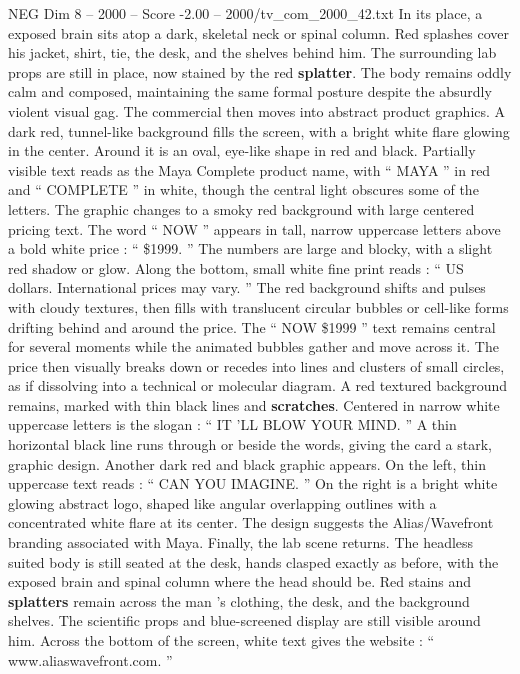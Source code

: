 \begin{textsample}{NEG Dim 8 – 2000 – Score -2.00 – 2000/tv\_com\_2000\_42.txt}
In its place, a exposed brain sits atop a dark, skeletal neck or spinal column.
Red splashes cover his jacket, shirt, tie, the desk, and the shelves behind him.
The surrounding lab props are still in place, now stained by the red \textbf{splatter}.
The body remains oddly calm and composed, maintaining the same formal posture despite the absurdly violent visual gag.
The commercial then moves into abstract product graphics.
A dark red, tunnel-like background fills the screen, with a bright white flare glowing in the center.
Around it is an oval, eye-like shape in red and black.
Partially visible text reads as the Maya Complete product name, with “ MAYA ” in red and “ COMPLETE ” in white, though the central light obscures some of the letters.
The graphic changes to a smoky red background with large centered pricing text.
The word “ NOW ” appears in tall, narrow uppercase letters above a bold white price : “ \$1999. ” The numbers are large and blocky, with a slight red shadow or glow.
Along the bottom, small white fine print reads : “ US dollars.
International prices may vary. ” The red background shifts and pulses with cloudy textures, then fills with translucent circular bubbles or cell-like forms drifting behind and around the price.
The “ NOW \$1999 ” text remains central for several moments while the animated bubbles gather and move across it.
The price then visually breaks down or recedes into lines and clusters of small circles, as if dissolving into a technical or molecular diagram.
A red textured background remains, marked with thin black lines and \textbf{scratches}.
Centered in narrow white uppercase letters is the slogan : “ IT ’LL BLOW YOUR MIND. ” A thin horizontal black line runs through or beside the words, giving the card a stark, graphic design.
Another dark red and black graphic appears.
On the left, thin uppercase text reads : “ CAN YOU IMAGINE. ” On the right is a bright white glowing abstract logo, shaped like angular overlapping outlines with a concentrated white flare at its center.
The design suggests the Alias/Wavefront branding associated with Maya.
Finally, the lab scene returns.
The headless suited body is still seated at the desk, hands clasped exactly as before, with the exposed brain and spinal column where the head should be.
Red stains and \textbf{splatters} remain across the man ’s clothing, the desk, and the background shelves.
The scientific props and blue-screened display are still visible around him.
Across the bottom of the screen, white text gives the website : “ www.aliaswavefront.com. ”

\end{textsample}
